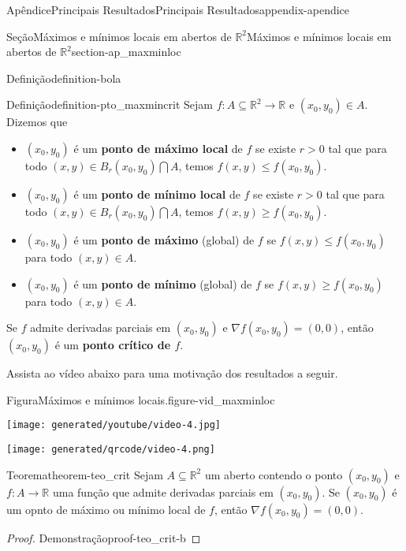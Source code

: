 \documentclass[oneside,10pt,]{book}
\newcommand{\terminology}[1]{\textbf{#1}}
\numberwithin{equation}{section}
\newcommand{\R}{\mathbb R}
\begin{document}
\begin{appendixptx}{Apêndice}{Principais Resultados}{}{Principais Resultados}{}{}{appendix-apendice}
\begin{sectionptx}{Seção}{Máximos e mínimos locais em abertos de \(\R^2\)}{}{Máximos e mínimos locais em abertos de \(\R^2\)}{}{}{section-ap_maxminloc}
\begin{definition}{Definição}{}{definition-bola}
\end{definition}
\begin{definition}{Definição}{}{definition-pto_maxmincrit}%
Sejam \(f\colon A\subseteq\R^2\to\R\) e \((x_0,y_0)\in
A\). Dizemos que%
\begin{itemize}[label=\textbullet]
\item{}\((x_0,y_0)\) é um \terminology{ponto de máximo local} de \(f\) se existe \(r>0\) tal que para todo \((x,y)\in
B_r(x_0,y_0)\bigcap A\), temos \(f(x,y)\leq
f(x_0,y_0)\).%
\item{}\((x_0,y_0)\) é um \terminology{ponto de mínimo local} de \(f\) se existe \(r>0\) tal que para todo \((x,y)\in
B_r(x_0,y_0)\bigcap A\), temos \(f(x,y)\geq
f(x_0,y_0)\).%
\item{}\((x_0,y_0)\) é um \terminology{ponto de máximo} (global) de \(f\) se \(f(x,y)\leq f(x_0,y_0)\) para todo \((x,y)\in A\).%
\item{}\((x_0,y_0)\) é um \terminology{ponto de mínimo} (global) de \(f\) se \(f(x,y)\geq f(x_0,y_0)\) para todo \((x,y)\in
A\).%
\end{itemize}
%
\par
Se \(f\) admite derivadas parciais em \((x_0,y_0)\) e \(\nabla f(x_0,y_0)=(0,0)\), então \((x_0,y_0)\) é um \terminology{ponto crítico de \(f\)}.%
\end{definition}
Assista ao vídeo abaixo para uma motivação dos resultados a seguir. \begin{figureptx}{Figura}{Máximos e mínimos locais.}{figure-vid_maxminloc}{}%
\begin{sidebyside}{2}{0.075}{0.075}{0.17}%
\begin{sbspanel}{0.47}%
\texttt{[image: generated/youtube/video-4.jpg]}
\end{sbspanel}%
\begin{sbspanel}{0.21}%
\texttt{[image: generated/qrcode/video-4.png]}
\end{sbspanel}%
\end{sidebyside}%
\tcblower
\end{figureptx}%
%
\begin{theorem}{Teorema}{}{}{theorem-teo_crit}%
Sejam \(A\subseteq\R^2\) um aberto contendo o ponto \((x_0,y_0)\) e \(f\colon A\to\R\) uma função que admite derivadas parciais em \((x_0,y_0)\). Se \((x_0,y_0)\) é um opnto de máximo ou mínimo local de \(f\), então \(\nabla
f(x_0,y_0)=(0,0)\).\end{theorem}
\begin{proof}{Demonstração}{}{proof-teo_crit-b}

\end{proof}
\end{sectionptx}
\end{appendixptx}
\end{document}
